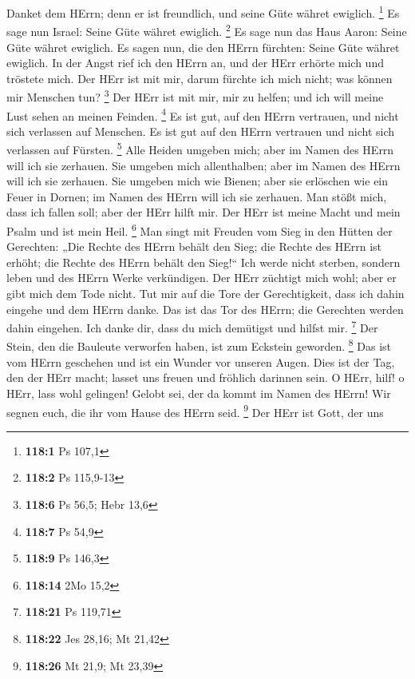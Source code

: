  Danket dem HErrn; denn er ist freundlich, und seine Güte
währet ewiglich. \footnote{\textbf{118:1} Ps 107,1}  Es sage
nun Israel: Seine Güte währet ewiglich. \footnote{\textbf{118:2} Ps
  115,9-13}  Es sage nun das Haus Aaron: Seine Güte währet
ewiglich.  Es sagen nun, die den HErrn fürchten: Seine Güte
währet ewiglich.  In der Angst rief ich den HErrn an, und
der HErr erhörte mich und tröstete mich.  Der HErr ist mit
mir, darum fürchte ich mich nicht; was können mir Menschen tun?
\footnote{\textbf{118:6} Ps 56,5; Hebr 13,6}  Der HErr ist
mit mir, mir zu helfen; und ich will meine Lust sehen an meinen Feinden.
\footnote{\textbf{118:7} Ps 54,9}  Es ist gut, auf den HErrn
vertrauen, und nicht sich verlassen auf Menschen.  Es ist
gut auf den HErrn vertrauen und nicht sich verlassen auf Fürsten.
\footnote{\textbf{118:9} Ps 146,3}  Alle Heiden umgeben
mich; aber im Namen des HErrn will ich sie zerhauen.  Sie
umgeben mich allenthalben; aber im Namen des HErrn will ich sie
zerhauen.  Sie umgeben mich wie Bienen; aber sie erlöschen
wie ein Feuer in Dornen; im Namen des HErrn will ich sie zerhauen.
 Man stößt mich, dass ich fallen soll; aber der HErr hilft
mir.  Der HErr ist meine Macht und mein Psalm und ist mein
Heil. \footnote{\textbf{118:14} 2Mo 15,2}  Man singt mit
Freuden vom Sieg in den Hütten der Gerechten: „Die Rechte des HErrn
behält den Sieg;  die Rechte des HErrn ist erhöht; die
Rechte des HErrn behält den Sieg!{}``  Ich werde nicht
sterben, sondern leben und des HErrn Werke verkündigen. 
Der HErr züchtigt mich wohl; aber er gibt mich dem Tode nicht.
 Tut mir auf die Tore der Gerechtigkeit, dass ich dahin
eingehe und dem HErrn danke.  Das ist das Tor des HErrn;
die Gerechten werden dahin eingehen.  Ich danke dir, dass
du mich demütigst und hilfst mir. \footnote{\textbf{118:21} Ps 119,71}
 Der Stein, den die Bauleute verworfen haben, ist zum
Eckstein geworden. \footnote{\textbf{118:22} Jes 28,16; Mt 21,42}
 Das ist vom HErrn geschehen und ist ein Wunder vor unseren
Augen.  Dies ist der Tag, den der HErr macht; lasset uns
freuen und fröhlich darinnen sein.  O HErr, hilf! o HErr,
lass wohl gelingen!  Gelobt sei, der da kommt im Namen des
HErrn! Wir segnen euch, die ihr vom Hause des HErrn seid. \footnote{\textbf{118:26}
  Mt 21,9; Mt 23,39}  Der HErr ist Gott, der uns
